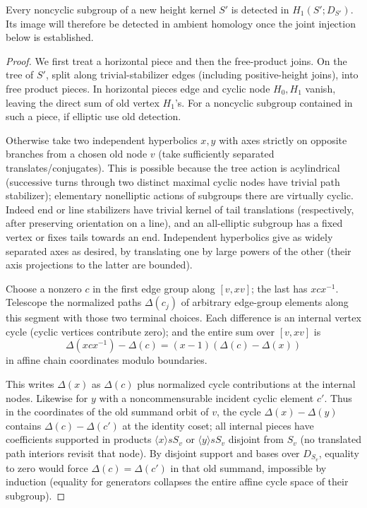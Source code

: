 \begin{lemma}\label{close:join-detection}
Every noncyclic subgroup of a new height kernel $S'$ is detected in
$H_1(S';D_{S'})$. Its image will therefore be detected in ambient
homology once the joint injection below is established.
\end{lemma}

\begin{proof}
We first treat a horizontal piece and then the free-product joins.
On the tree of \(S'\), split along trivial-stabilizer edges (including
positive-height joins), into free product pieces. In horizontal
pieces edge and cyclic node \(H_0,H_1\) vanish, leaving the direct
sum of old vertex \(H_1\)'s. For a noncyclic subgroup contained in
such a piece, if elliptic use old detection.

Otherwise take two independent hyperbolics \(x,y\) with axes strictly on opposite branches from a chosen old node \(v\) (take sufficiently separated translates/conjugates). This is possible because the tree action is acylindrical (successive turns through two distinct maximal cyclic nodes have trivial path stabilizer); elementary nonelliptic actions of subgroups there are virtually cyclic. Indeed end or line stabilizers have trivial kernel of tail translations (respectively, after preserving orientation on a line), and an all-elliptic subgroup has a fixed vertex or fixes tails towards an end. Independent hyperbolics give as widely separated axes as desired, by translating one by large powers of the other (their axis projections to the latter are bounded).

Choose a nonzero \(c\) in the first edge group along \([v,xv]\); the last has \(xcx^{-1}\). Telescope the normalized paths \(\Delta(c_j)\) of arbitrary edge-group elements along this segment with those two terminal choices. Each difference is an internal vertex cycle (cyclic vertices contribute zero); and the entire sum over \([v,xv]\) is
\[
           \Delta(xcx^{-1})-\Delta(c)=(x-1)(\Delta(c)-\Delta(x))
\]
in affine chain coordinates modulo boundaries.

This writes \(\Delta(x)\) as \(\Delta(c)\) plus normalized cycle contributions at the internal nodes. Likewise for \(y\) with a noncommensurable incident cyclic element \(c'\). Thus in the coordinates of the old summand orbit of \(v\), the cycle \(\Delta(x)-\Delta(y)\) contains \(\Delta(c)-\Delta(c')\) at the identity coset; all internal pieces have coefficients supported in products \(\langle x\rangle s S_v\) or \(\langle y\rangle s S_v\) disjoint from \(S_v\) (no translated path interiors revisit that node). By disjoint support and bases over \(D_{S_v}\), equality to zero would force \(\Delta(c)=\Delta(c')\) in that old summand, impossible by induction (equality for generators collapses the entire affine cycle space of their subgroup).


\end{proof}
